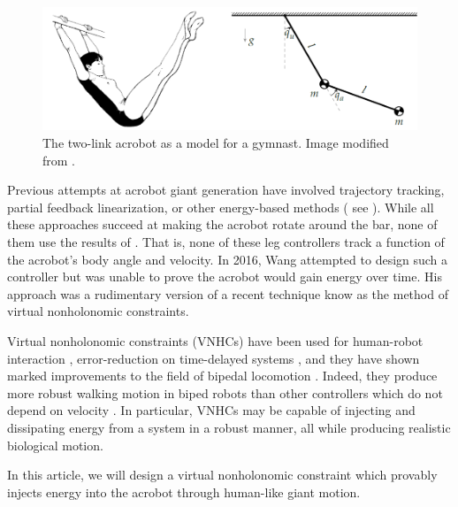 \documentclass[journal,twoside,web]{ieeecolor}
\begin{document}
\begin{figure}
    \centering
    \includegraphics[width=\linewidth]{acrobot_gymnast.png}
    \caption{The two-link acrobot as a model for a gymnast.
    Image modified from \cite{xingbo_thesis}.}
    \label{fig:acrobot}
\end{figure}

Previous attempts at acrobot giant generation have involved
trajectory tracking, partial feedback linearization, or other energy-based
methods
( see
\cite{energy_pumping_robotic_swinging,swingup_giant_acrobot,dynamical_servo_acrobot_vc,control_giant_two_link_gymnastic_robot}
).
While all these approaches succeed at making the acrobot rotate around the
bar, none of them use the results of \cite{pendulum_length_giant_gymnastics}.
That is, none of these leg controllers track a function of the acrobot's body
angle and velocity.
In 2016, Wang attempted to design such a controller \cite{xingbo_thesis}
but was unable to prove the acrobot would gain energy over time.
His approach was a rudimentary version of a recent technique know as the method
of virtual nonholonomic constraints.

Virtual nonholonomic constraints (VNHCs) have been used for human-robot interaction
\cite{vnhc_human_robot_cooperation,psd_based_vnhc_redundant_manipulator,haptic_vnhc},
error-reduction on time-delayed systems \cite{vnhc_time_delay_teleop},
and they have shown marked improvements to the field of bipedal locomotion 
\cite{nhvc_dynamic_walking,
hybrid_zero_dynamics_bipedal_nhvcs,output_nhvc_bipedal_control}.
Indeed, they produce more robust walking motion in biped robots than
other controllers which do not depend on velocity \cite{nhvc_incline_walking}.
In particular, VNHCs may be capable of injecting and
dissipating energy from a system in a robust manner, all while producing
realistic biological motion. 

In this article, we will design a virtual nonholonomic constraint which provably
injects energy into the acrobot through human-like giant motion.
\end{document}

